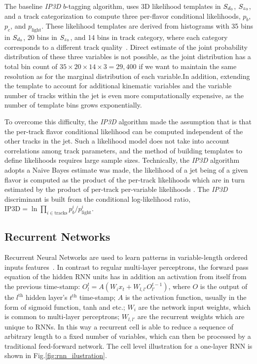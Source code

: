 The baseline \textit{IP3D} $b$-tagging algorithm, uses 3D likelihood templates in $S_{d{_0}}$, $S_{z{_0}}$, and a track categorization to compute three per-flavor conditional likelihoods, $p_b$, $p_c$, and $p_{\textrm{light}}$. These likelihood templates are derived from histograms with 35 bins in $S_{d{_0}}$, 20 bins in $S_{z{_0}}$, and 14 bins in track category, where each category corresponds to a different track quality~\cite{ATL-PHYS-PUB-2015-022}. Direct estimate of the joint probability distribution of these three variables is not possible, as the joint distribution has a total bin count of $35 \times 20 \times 14 \times 3 = 29,400$ if we want to maintain the same resolution as for the marginal distribution of each variable.In addition, extending the template to account for additional kinematic variables and the variable number of tracks within the jet is even more computationally expensive, as the number of template bins grows exponentially.

To overcome this difficulty, the \textit{IP3D} algorithm made the assumption that is that the per-track flavor conditional likelihood can be computed independent of the other tracks in the jet.  Such a likelihood model does not take into account correlations among track parameters, and the method of building templates to define likelihoods requires large sample sizes. Technically, the \textit{IP3D} algorithm adopts a Naive Bayes estimate was made, the likelihood of a jet being of a given flavor is computed as the product of the per-track likelihoods which are in turn estimated by the product of per-track per-variable likelihoods . The \textit{IP3D} discriminant is built from the conditional log-likelihood ratio, $\textrm{IP3D}=\ln \prod_{i \in \textrm{tracks}} p_b^i / p_{\textrm{light}}^i$. 

\subsection{Recurrent Networks}

Recurrent Neural Networks are used to learn patterns in variable-length ordered inputs features~\cite{ref:RNNthesis, dlbook}. In contrast to regular multi-layer perceptrons, the forward pass equation of the hidden RNN units has in addition an activation from itself from the previous time-stamp: $O^t_l = A( W_i x_t + W_{l,l'} O^{t-1}_{l'})$, where $O$ is the output of the $l^{\text{th}}$ hidden layer's $t^{\text{th}}$ time-stamp; $A$ is the activation function, usually in the form of sigmoid function, tanh and etc.; $W_i$ are the network input weights, which is common to multi-layer perceptrons; $W_{l,l'}$ are the recurrent weights which are unique to RNNs. In this way a recurrent cell is able to reduce a sequence of arbitrary length to a fixed number of variables, which can then be processed by a traditional feed-forward network. The cell level illustration for a one-layer RNN is shown in Fig.\ref{fig:rnn_ilustration}.

